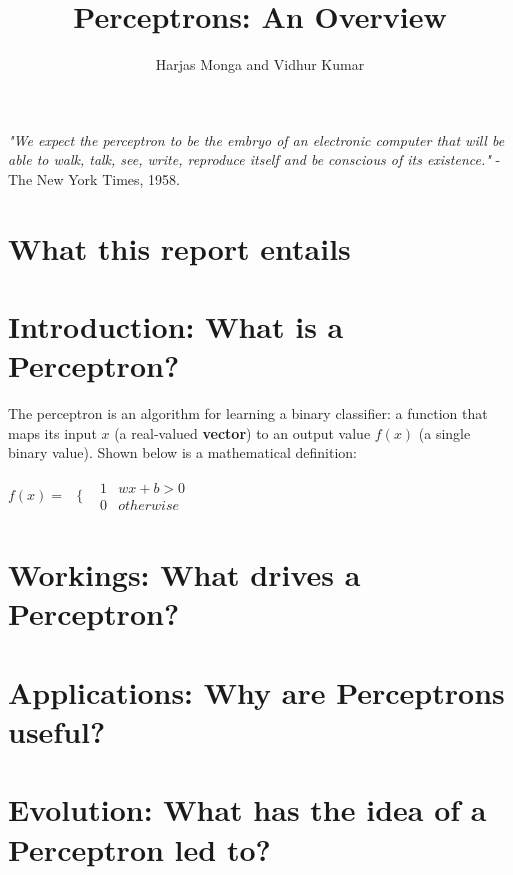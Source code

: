 \documentclass[12pt, titlepage, a4paper]{article}
\title{Perceptrons: An Overview}
\author{Harjas Monga and Vidhur Kumar}
\begin{document}
	\maketitle
	
	\tableofcontents
	
	\newpage

	\textit{"We expect the perceptron to be the embryo of an electronic computer that will be able to walk, talk, see, write, reproduce itself and be conscious of its existence."} - The New York Times, 1958.	
	
	\section{What this report entails}
			
	
	\section{Introduction: What is a Perceptron?}
	
	The perceptron is an algorithm for learning a binary classifier: a function that maps its input $x$ (a real-valued \textbf{vector}) to an output value $f(x)$ (a single binary value). Shown below is a mathematical definition: \\
	
	\begin{center}
		$f(x) = $
		$
\begin{array}{cc}
  \{ & 
    \begin{array}{cc}
    	1 & wx + b > 0 \\
    	0 & otherwise
    \end{array}
\end{array}
		$
	\end{center}
	
	\section{Workings: What drives a Perceptron?}
		
	\section{Applications: Why are Perceptrons useful?}
	
	
	\section{Evolution: What has the idea of a Perceptron led to?}
\end{document}
